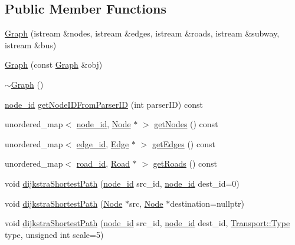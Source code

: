 \subsection*{Public Member Functions}
\begin{DoxyCompactItemize}
\item 
\hyperlink{class_graph_aadb341e62a5548bf406c05834aa187da}{Graph} (istream \&nodes, istream \&edges, istream \&roads, istream \&subway, istream \&bus)
\item 
\hyperlink{class_graph_a7a3f0c7dceffa85819bf122c49fd973c}{Graph} (const \hyperlink{class_graph}{Graph} \&obj)
\item 
\hyperlink{class_graph_a902c5b3eacb66d60752525ab23297a95}{$\sim$\+Graph} ()
\item 
\hyperlink{_node_8hpp_a9d6265804805c2375068fd7484840dc6}{node\+\_\+id} \hyperlink{class_graph_aec10981cceac64d033e2e0de5b34c995}{get\+Node\+I\+D\+From\+Parser\+ID} (int parser\+ID) const
\item 
unordered\+\_\+map$<$ \hyperlink{_node_8hpp_a9d6265804805c2375068fd7484840dc6}{node\+\_\+id}, \hyperlink{class_node}{Node} $\ast$ $>$ \hyperlink{class_graph_aa64f6696d40b6a8e0d92df399ed11310}{get\+Nodes} () const
\item 
unordered\+\_\+map$<$ \hyperlink{_edge_8hpp_ad7d18d7b90a45b6625704e92d10aa3a0}{edge\+\_\+id}, \hyperlink{class_edge}{Edge} $\ast$ $>$ \hyperlink{class_graph_a7dd776ad17a9d14b14f044373c79a9bc}{get\+Edges} () const
\item 
unordered\+\_\+map$<$ \hyperlink{_road_8hpp_a8e0db0d135782948da5d293720dbfb46}{road\+\_\+id}, \hyperlink{class_road}{Road} $\ast$ $>$ \hyperlink{class_graph_a101befc9baedb7dc3aaa714c968dc943}{get\+Roads} () const
\item 
void \hyperlink{class_graph_a819fb225997f026a192ec5df1b17df84}{dijkstra\+Shortest\+Path} (\hyperlink{_node_8hpp_a9d6265804805c2375068fd7484840dc6}{node\+\_\+id} src\+\_\+id, \hyperlink{_node_8hpp_a9d6265804805c2375068fd7484840dc6}{node\+\_\+id} dest\+\_\+id=0)
\item 
void \hyperlink{class_graph_a0fc41701fa170ab69282ae8a571fdc04}{dijkstra\+Shortest\+Path} (\hyperlink{class_node}{Node} $\ast$src, \hyperlink{class_node}{Node} $\ast$destination=nullptr)
\item 
void \hyperlink{class_graph_a751cdeb2ca841f9d44d921cf1a43ddd0}{dijkstra\+Shortest\+Path} (\hyperlink{_node_8hpp_a9d6265804805c2375068fd7484840dc6}{node\+\_\+id} src\+\_\+id, \hyperlink{_node_8hpp_a9d6265804805c2375068fd7484840dc6}{node\+\_\+id} dest\+\_\+id, \hyperlink{class_transport_a1879cecfed0d4238e5a7af6d085db317}{Transport\+::\+Type} type, unsigned int scale=5)

\end{DoxyCompactItemize}
